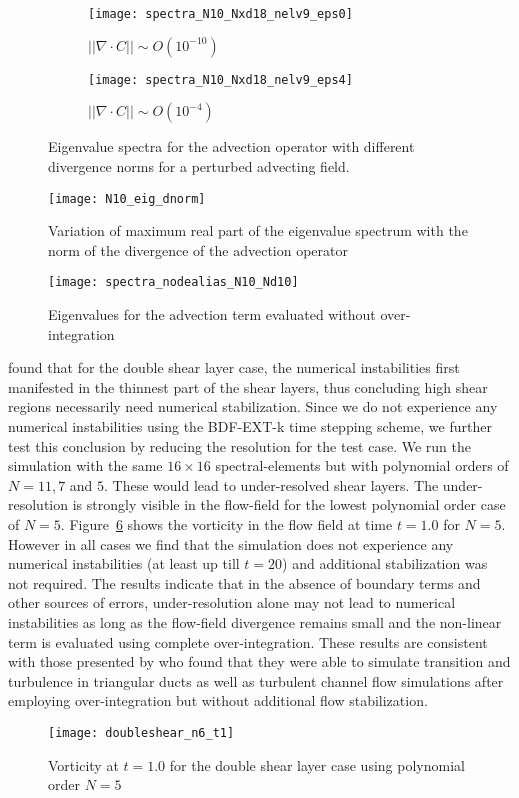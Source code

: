 \begin{figure}[h]
	\centering
	\begin{subfigure}[b]{0.45\textwidth}
		\centering
		\texttt{[image: spectra\_N10\_Nxd18\_nelv9\_eps0]}
		\caption{$||\nabla\cdot C|| \sim O(10^{-10})$}
		\label{fig:spectra_eps0}
	\end{subfigure}
	\begin{subfigure}[b]{0.45\textwidth}
		\centering
		\texttt{[image: spectra\_N10\_Nxd18\_nelv9\_eps4]}
		\caption{$||\nabla\cdot C|| \sim O(10^{-4})$}
		\label{fig:spectra_eps-4}
	\end{subfigure}
	\caption{Eigenvalue spectra for the advection operator with different divergence norms for a perturbed advecting field.}
	\label{fig:convection_spectra}
\end{figure}
\begin{figure}[h]
	\centerline{\texttt{[image: N10\_eig\_dnorm]}}
	\caption{\small{Variation of maximum real part of the eigenvalue spectrum with the norm of the divergence of the advection operator}}
	\label{fig:lambda_dnorm}
\end{figure}
\begin{figure}[h]
	\centerline{\texttt{[image: spectra\_nodealias\_N10\_Nd10]}}
	\caption{\small{Eigenvalues for the advection term evaluated without over-integration}}
	\label{fig:spectra_nodealias}
\end{figure}
\cite{malm13} found that for the double shear layer case, the numerical instabilities first manifested in the thinnest part of the shear layers, thus concluding high shear regions necessarily need numerical stabilization. Since we do not experience any numerical instabilities using the BDF-EXT-k time stepping scheme, we further test this conclusion by reducing the resolution for the test case. We run the simulation with the same $16\times16$ spectral-elements but with polynomial orders of $N=11,7$ and $5$. These would lead to under-resolved shear layers. The under-resolution is strongly visible in the flow-field for the lowest polynomial order case of $N=5$. Figure~\ref{fig:vorticity_n6_t1} shows the vorticity in the flow field at time $t=1.0$ for $N=5$. However in all cases we find that the simulation does not experience any numerical instabilities (at least up till $t=20$) and additional stabilization was not required. The results indicate that in the absence of boundary terms and other sources of errors, under-resolution alone may not lead to numerical instabilities as long as the flow-field divergence remains small and the non-linear term is evaluated using complete over-integration. These results are consistent with those presented by \cite{kirby03} who found that they were able to simulate transition and turbulence in triangular ducts as well as turbulent channel flow simulations after employing over-integration but without additional flow stabilization.
\begin{figure}[h]
	\centering
	\texttt{[image: doubleshear\_n6\_t1]}
	\caption{\small{Vorticity at $t=1.0$ for the double shear layer case using polynomial order $N=5$}}
	\label{fig:vorticity_n6_t1}
\end{figure}


